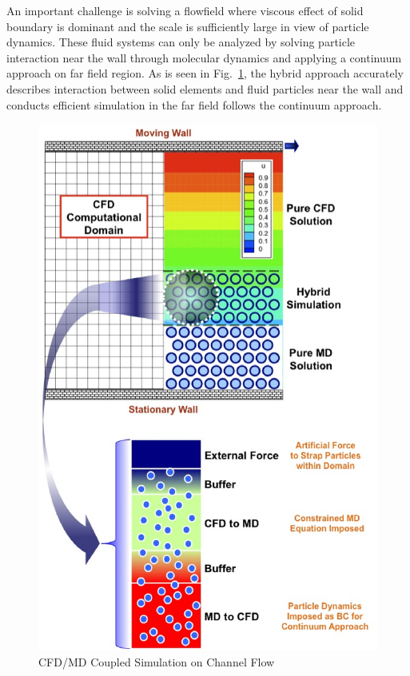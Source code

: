 \documentclass[conference,final]{IEEEtran}
\begin{document}
An important challenge is solving a flowfield where viscous effect of solid boundary is dominant and the scale is sufficiently large in view of particle dynamics. These fluid systems can only be analyzed by solving particle interaction near the wall through molecular dynamics and applying a continuum approach on far field region. As is seen in Fig.~\ref{Fig:Couette}, the hybrid approach accurately describes interaction between solid elements and fluid particles near the wall and conducts efficient simulation in the far field follows the continuum approach.

\begin{figure}
\centering
\includegraphics[scale=0.45]{fig1.eps}
\caption{\small CFD/MD Coupled Simulation on Channel Flow}
\label{Fig:Couette}
\end{figure}
\end{document}

